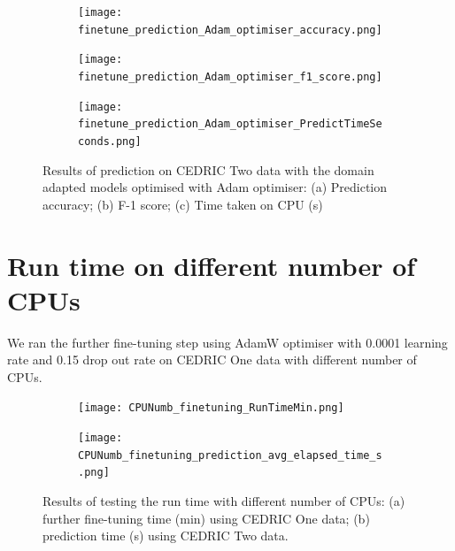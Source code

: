 \documentclass[a4paper,12pt]{article}
\newcommand{\figwidthhh}{0.45\textwidth}
\newcommand{\inghamOne}{CEDRIC One\xspace}   %
\newcommand{\inghamTwo}{CEDRIC Two\xspace}  %
\begin{document}
\begin{figure}[h!]
	\begin{center}
		\begin{subfigure}[b]{\figwidthhh}
			\caption{} 
			\texttt{[image: finetune\_prediction\_Adam\_optimiser\_accuracy.png]}
		\end{subfigure}
        \hfill
		\begin{subfigure}[b]{\figwidthhh}
			\caption{}
			\texttt{[image: finetune\_prediction\_Adam\_optimiser\_f1\_score.png]}
		\end{subfigure}
        \hfill
		\begin{subfigure}[b]{\figwidthhh}
			\caption{}
			\texttt{[image: finetune\_prediction\_Adam\_optimiser\_PredictTimeSeconds.png]}
		\end{subfigure}
	\end{center}
	\caption{Results of prediction on \inghamTwo data with the domain adapted models optimised with Adam optimiser: (a) Prediction accuracy; (b) F-1 score; (c) Time taken on CPU (s)
	} 
	\label{fig:res_finetune_predict_adam}
\end{figure}


\newpage
\section{Run time on different number of CPUs}
\label{sec:runtime}

We ran the further fine-tuning step using AdamW optimiser with 0.0001 learning rate and 0.15 drop out rate on \inghamOne data with different number of CPUs.

\begin{figure}[h!]
	\begin{center}
		\begin{subfigure}[b]{\figwidthhh}
			\caption{} 
			\texttt{[image: CPUNumb\_finetuning\_RunTimeMin.png]}
		\end{subfigure}
		\hfill
		\begin{subfigure}[b]{\figwidthhh}
			\caption{}
			\texttt{[image: CPUNumb\_finetuning\_prediction\_avg\_elapsed\_time\_s.png]}
		\end{subfigure}
	\end{center}                                                                
	\caption{Results of testing the run time with different number of CPUs: (a) further fine-tuning time (min) using \inghamOne data; (b) prediction time (s) using \inghamTwo data.
	}
\end{figure}
\end{document}
